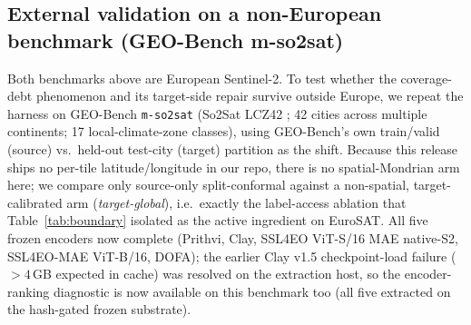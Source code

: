 \documentclass[journal]{IEEEtran}
\renewcommand{\_}{\textunderscore\allowbreak}
\begin{document}
\subsection{External validation on a non-European benchmark (GEO-Bench m-so2sat)}
Both benchmarks above are European Sentinel-2. To test whether the coverage-debt phenomenon and its
target-side repair survive outside Europe, we repeat the harness on GEO-Bench \citep{lacoste2023geobench}
\texttt{m-so2sat} (So2Sat LCZ42 \citep{zhu2020so2sat}; 42 cities across multiple continents; 17 local-climate-zone classes),
using GEO-Bench's own train/valid (source) vs.\ held-out test-city (target) partition as the shift. Because
this release ships no per-tile latitude/longitude in our repo, there is no spatial-Mondrian arm here;
we compare only source-only split-conformal against a non-spatial, target-calibrated arm
(\emph{target-global}), i.e.\ exactly the label-access ablation that Table~\ref{tab:boundary} isolated as the
active ingredient on EuroSAT. All five frozen encoders now complete (Prithvi, Clay, SSL4EO ViT-S/16 MAE
native-S2, SSL4EO-MAE ViT-B/16, DOFA); the earlier Clay v1.5 checkpoint-load failure ($>4$\,GB expected in
cache) was resolved on the extraction host, so the encoder-ranking diagnostic is now available on this
benchmark too (all five extracted on the hash-gated frozen substrate).
\end{document}
